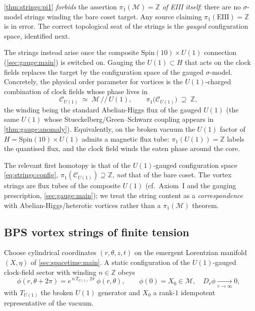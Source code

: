 \begin{remark}
\label{rem:strings:guard}
\autoref{thm:strings:pi1} \emph{forbids} the assertion
$\pi_{1}(\mathcal{M})=\mathbb{Z}$ \emph{of EIII itself}: there are no
$\sigma$-model strings winding the bare coset target. Any source claiming
$\pi_{1}(\mathrm{EIII})=\mathbb{Z}$ is in error. The correct topological
seat of the strings is the \emph{gauged} configuration space, identified
next.
\end{remark}

The strings instead arise once the composite $\mathrm{Spin}(10)\times
U(1)$ connection (\autoref{sec:gauge:main}) is switched on. Gauging the
$U(1)\subset H$ that acts on the clock fields replaces the target by the
configuration space of the gauged $\sigma$-model. Concretely, the
physical order parameter for vortices is the $U(1)$-charged combination
of clock fields whose phase lives in
\[
   \mathcal{C}_{U(1)} \;\simeq\; \mathcal{M}\,/\!/\,U(1),
   \qquad
   \pi_{1}\bigl(\mathcal{C}_{U(1)}\bigr)\;\supseteq\;\mathbb{Z},
   \label{eq:strings:config}
\]
the winding being the standard Abelian-Higgs flux of the gauged $U(1)$
(the same $U(1)$ whose Stueckelberg/Green--Schwarz coupling appears in
\autoref{thm:gauge:anomaly}). Equivalently, on the broken vacuum the
$U(1)$ factor of $H=\mathrm{Spin}(10)\times U(1)$ admits a magnetic flux
tube: $\pi_{1}(U(1))=\mathbb{Z}$ labels the quantised flux, and the clock
field winds the eaten phase around the core.

\begin{postulate}
\label{post:strings:sector}
The relevant first homotopy is that of the $U(1)$-gauged configuration
space \eqref{eq:strings:config}, $\pi_{1}(\mathcal{C}_{U(1)})\supseteq
\mathbb{Z}$, \emph{not} that of the bare coset. The vortex strings are
flux tubes of the composite $U(1)$ (cf.\ Axiom~I and the gauging
prescription, \autoref{sec:gauge:main}); we treat the string content as a
\emph{correspondence} with Abelian-Higgs/heterotic vortices rather than a
$\pi_{1}(\mathcal{M})$ theorem.
\end{postulate}

\subsection{BPS vortex strings of finite tension}
\label{sec:strings:bps}

Choose cylindrical coordinates $(r,\theta,z,t)$ on the emergent
Lorentzian manifold $(X,\eta)$ of \autoref{sec:spacetime:main}. A static
configuration of the $U(1)$-gauged clock-field sector with winding
$n\in\mathbb{Z}$ obeys
\begin{equation}
  \phi(r,\theta+2\pi)=e^{\,n\,T_{U(1)}\,2\pi}\,\phi(r,\theta),
  \qquad
  \phi(0)=X_{0}\in\mathcal{M},\quad
  D_{r}\phi\xrightarrow[r\to\infty]{}0,
  \label{eq:strings:ansatz}
\end{equation}
with $T_{U(1)}$ the broken $U(1)$ generator and $X_{0}$ a rank-$1$
idempotent representative of the vacuum.

